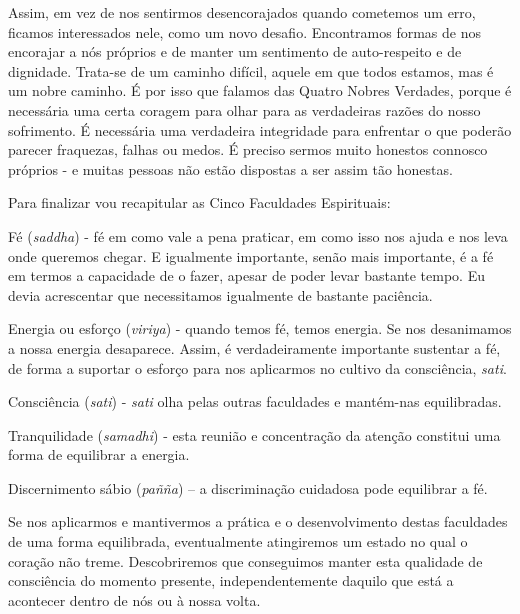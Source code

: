 Assim, em vez de nos sentirmos desencorajados quando cometemos um erro,
ficamos interessados nele, como um novo desafio. Encontramos formas de
nos encorajar a nós próprios e de manter um sentimento de auto-respeito
e de dignidade. Trata-se de um caminho difícil, aquele em que todos
estamos, mas é um nobre caminho. É por isso que falamos das Quatro
Nobres Verdades, porque é necessária uma certa coragem para olhar para
as verdadeiras razões do nosso sofrimento. É necessária uma verdadeira
integridade para enfrentar o que poderão parecer fraquezas, falhas ou
medos. É preciso sermos muito honestos connosco próprios - e muitas
pessoas não estão dispostas a ser assim tão honestas.

Para finalizar vou recapitular as Cinco Faculdades Espirituais:

Fé (\emph{saddha}) - fé em como vale a pena praticar, em como isso nos
ajuda e nos leva onde queremos chegar. E igualmente importante, senão
mais importante, é a fé em termos a capacidade de o fazer, apesar de
poder levar bastante tempo. Eu devia acrescentar que necessitamos
igualmente de bastante paciência.

Energia ou esforço (\emph{viriya}) - quando temos fé, temos energia. Se
nos desanimamos a nossa energia desaparece. Assim, é verdadeiramente
importante sustentar a fé, de forma a suportar o esforço para nos
aplicarmos no cultivo da consciência, \emph{sati}.

Consciência (\emph{sati}) - \emph{sati} olha pelas outras faculdades e
mantém-nas equilibradas.

Tranquilidade (\emph{samadhi}) - esta reunião e concentração da atenção
constitui uma forma de equilibrar a energia.

Discernimento sábio (\emph{pañña}) -- a discriminação cuidadosa pode
equilibrar a fé.

Se nos aplicarmos e mantivermos a prática e o desenvolvimento destas
faculdades de uma forma equilibrada, eventualmente atingiremos um estado
no qual o coração não treme. Descobriremos que conseguimos manter esta
qualidade de consciência do momento presente, independentemente daquilo
que está a acontecer dentro de nós ou à nossa volta.


